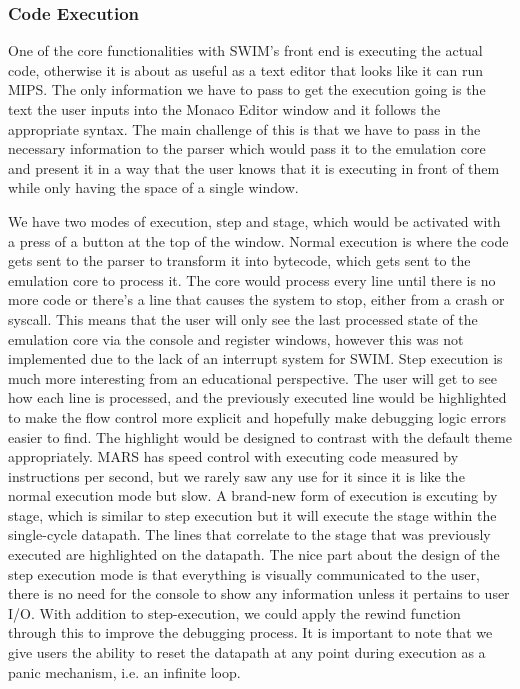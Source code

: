 \documentclass[
    paper=letter,
    parskip=half,
    fontsize=12pt,
    titlepage=firstiscover,
    toc=bibliography,
    numbers=endperiod
]{scrartcl}
\begin{document}
\subsubsection{Code Execution}

One of the core functionalities with SWIM's front end is executing the
actual code, otherwise it is about as useful as a text editor that looks
like it can run MIPS. The only information we have to pass to get the
execution going is the text the user inputs into the Monaco Editor
window and it follows the appropriate syntax. The main challenge of this
is that we have to pass in the necessary information to the parser which
would pass it to the emulation core and present it in a way that the
user knows that it is executing in front of them while only having the
space of a single window.

We have two modes of execution, step and stage, which would be activated
with a press of a button at the top of the window. Normal execution is
where the code gets sent to the parser to transform it into bytecode,
which gets sent to the emulation core to process it. The core would
process every line until there is no more code or there's a line that
causes the system to stop, either from a crash or syscall. This means
that the user will only see the last processed state of the emulation
core via the console and register windows, however this was not
implemented due to the lack of an interrupt system for SWIM. Step
execution is much more interesting from an educational perspective. The
user will get to see how each line is processed, and the previously
executed line would be highlighted to make the flow control more
explicit and hopefully make debugging logic errors easier to find. The
highlight would be designed to contrast with the default theme
appropriately. MARS has speed control with executing code measured by
instructions per second, but we rarely saw any use for it since it is
like the normal execution mode but slow. A brand-new form of execution
is excuting by stage, which is similar to step execution but it will
execute the stage within the single-cycle datapath. The lines that
correlate to the stage that was previously executed are highlighted on
the datapath. The nice part about the design of the step execution mode
is that everything is visually communicated to the user, there is no
need for the console to show any information unless it pertains to user
I/O. With addition to step-execution, we could apply the rewind function
through this to improve the debugging process. It is important to note
that we give users the ability to reset the datapath at any point during
execution as a panic mechanism, i.e. an infinite loop.
\end{document}
